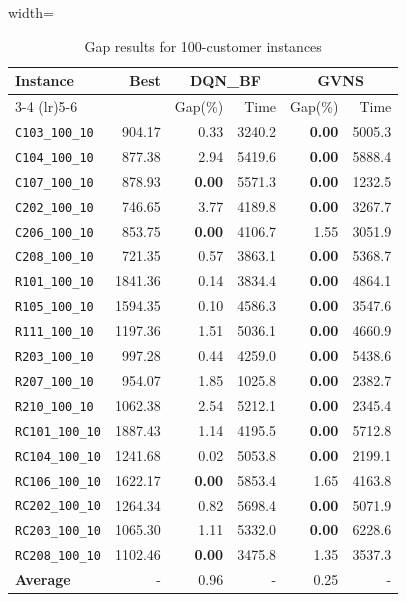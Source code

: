 \begin{table}[ht]
\centering
\small
\setlength{\tabcolsep}{5pt}
\caption{Gap results for 100-customer instances}
\vspace{4mm}
\begin{adjustbox}{width=\textwidth}
\begin{tabular}{l r r r @{\hspace{8pt}} r r @{\hspace{8pt}}}
\toprule
\multirow{2}{*}{Instance} & \multirow{2}{*}{Best} & \multicolumn{2}{c}{DQN\_BF} & \multicolumn{2}{c}{GVNS} \\
\cmidrule(lr){3-4} \cmidrule(lr){5-6}
 &  & Gap(\%) & Time & Gap(\%) & Time \\
\midrule
\texttt{C103\_100\_10} & 904.17 & 0.33 & 3240.2 & \textbf{0.00} & 5005.3 \\
\texttt{C104\_100\_10} & 877.38 & 2.94 & 5419.6 & \textbf{0.00} & 5888.4 \\
\texttt{C107\_100\_10} & 878.93 & \textbf{0.00} & 5571.3 & \textbf{0.00} & 1232.5 \\
\texttt{C202\_100\_10} & 746.65 & 3.77 & 4189.8 & \textbf{0.00} & 3267.7 \\
\texttt{C206\_100\_10} & 853.75 & \textbf{0.00} & 4106.7 & 1.55 & 3051.9 \\
\texttt{C208\_100\_10} & 721.35 & 0.57 & 3863.1 & \textbf{0.00} & 5368.7 \\
\texttt{R101\_100\_10} & 1841.36 & 0.14 & 3834.4 & \textbf{0.00} & 4864.1 \\
\texttt{R105\_100\_10} & 1594.35 & 0.10 & 4586.3 & \textbf{0.00} & 3547.6 \\
\texttt{R111\_100\_10} & 1197.36 & 1.51 & 5036.1 & \textbf{0.00} & 4660.9 \\
\texttt{R203\_100\_10} & 997.28 & 0.44 & 4259.0 & \textbf{0.00} & 5438.6 \\
\texttt{R207\_100\_10} & 954.07 & 1.85 & 1025.8 & \textbf{0.00} & 2382.7 \\
\texttt{R210\_100\_10} & 1062.38 & 2.54 & 5212.1 & \textbf{0.00} & 2345.4 \\
\texttt{RC101\_100\_10} & 1887.43 & 1.14 & 4195.5 & \textbf{0.00} & 5712.8 \\
\texttt{RC104\_100\_10} & 1241.68 & 0.02 & 5053.8 & \textbf{0.00} & 2199.1 \\
\texttt{RC106\_100\_10} & 1622.17 & \textbf{0.00} & 5853.4 & 1.65 & 4163.8 \\
\texttt{RC202\_100\_10} & 1264.34 & 0.82 & 5698.4 & \textbf{0.00} & 5071.9 \\
\texttt{RC203\_100\_10} & 1065.30 & 1.11 & 5332.0 & \textbf{0.00} & 6228.6 \\
\texttt{RC208\_100\_10} & 1102.46 & \textbf{0.00} & 3475.8 & 1.35 & 3537.3 \\
\midrule
\textbf{Average} & - & 0.96 & - & 0.25 & - \\
\bottomrule
\end{tabular}
\end{adjustbox}
\end{table}